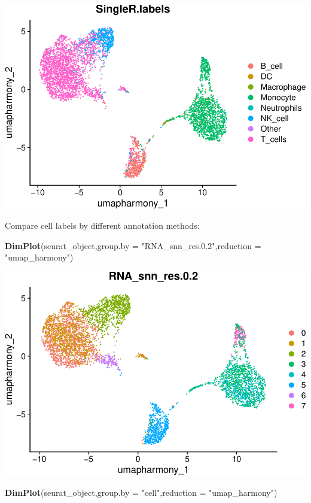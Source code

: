 \documentclass[
]{book}
\newenvironment{Shaded}{\begin{snugshade}}{\end{snugshade}}
\newcommand{\AttributeTok}[1]{\textcolor[rgb]{0.13,0.29,0.53}{#1}}
\newcommand{\FunctionTok}[1]{\textcolor[rgb]{0.13,0.29,0.53}{\textbf{#1}}}
\newcommand{\NormalTok}[1]{#1}
\newcommand{\StringTok}[1]{\textcolor[rgb]{0.31,0.60,0.02}{#1}}
\begin{document}
\includegraphics{scRNAseqInR_ABACBS_2024_Doco_files/figure-latex/unnamed-chunk-37-1.pdf}

Compare cell labels by different annotation methods:

\begin{Shaded}
\begin{Highlighting}[]
\FunctionTok{DimPlot}\NormalTok{(seurat\_object,}\AttributeTok{group.by =} \StringTok{"RNA\_snn\_res.0.2"}\NormalTok{,}\AttributeTok{reduction =} \StringTok{"umap\_harmony"}\NormalTok{)}
\end{Highlighting}
\end{Shaded}

\includegraphics{scRNAseqInR_ABACBS_2024_Doco_files/figure-latex/unnamed-chunk-38-1.pdf}

\begin{Shaded}
\begin{Highlighting}[]

\FunctionTok{DimPlot}\NormalTok{(seurat\_object,}\AttributeTok{group.by =} \StringTok{"cell"}\NormalTok{,}\AttributeTok{reduction =} \StringTok{"umap\_harmony"}\NormalTok{)}
\end{Highlighting}
\end{Shaded}
\end{document}
